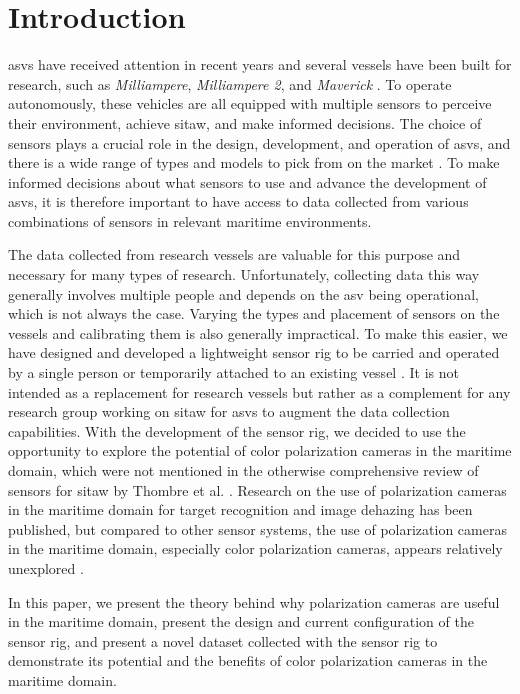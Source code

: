 \section{Introduction}
\glspl{asv} have received attention in recent years and several vessels have been built for research, such as \textit{Milliampere}, \textit{Milliampere 2}, and \textit{Maverick} \cite{brekkeMilliAmpereAutonomousFerry2022}\cite{zhangDesignBuildAutonomous2023}\cite{eideAutonomousUrbanPassenger2024}.
To operate autonomously, these vehicles are all equipped with multiple sensors to perceive their environment, achieve \gls{sitaw}, and make informed decisions.
The choice of sensors plays a crucial role in the design, development, and operation of \glspl{asv}, and there is a wide range of types and models to pick from on the market \cite{thombreSensorsAITechniques2022}.
To make informed decisions about what sensors to use and advance the development of \glspl{asv}, it is therefore important to have access to data collected from various combinations of sensors in relevant maritime environments.

The data collected from research vessels are valuable for this purpose and necessary for many types of research.
Unfortunately, collecting data this way generally involves multiple people and depends on the \gls{asv} being operational, which is not always the case.
Varying the types and placement of sensors on the vessels and calibrating them is also generally impractical.
To make this easier, we have designed and developed a lightweight sensor rig to be carried and operated by a single person or temporarily attached to an existing vessel \cite{martensPavingWayEnhanced2023}.
It is not intended as a replacement for research vessels but rather as a complement for any research group working on \gls{sitaw} for \glspl{asv} to augment the data collection capabilities.
With the development of the sensor rig, we decided to use the opportunity to explore the potential of color polarization cameras in the maritime domain, which were not mentioned in the otherwise comprehensive review of sensors for \gls{sitaw} by Thombre et al. \cite{thombreSensorsAITechniques2022}.
Research on the use of polarization cameras in the maritime domain for target recognition and image dehazing has been published, but compared to other sensor systems, the use of polarization cameras in the maritime domain, especially color polarization cameras, appears relatively unexplored \cite{zhongPolarizationintensityJointImaging2023}\cite{maPolarizationBasedMethodMaritime2024}.

In this paper, we present the theory behind why polarization cameras are useful in the maritime domain, present the design and current configuration of the sensor rig, and present a novel dataset collected with the sensor rig to demonstrate its potential and the benefits of color polarization cameras in the maritime domain.

